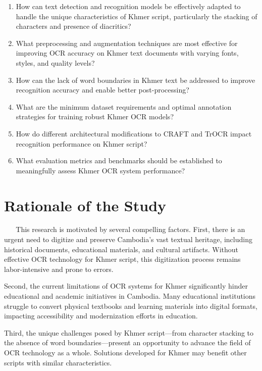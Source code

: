 \begin{enumerate}
    \item How can text detection and recognition models be effectively adapted to handle the unique characteristics of Khmer script, particularly the stacking of characters and presence of diacritics?
    
    \item What preprocessing and augmentation techniques are most effective for improving OCR accuracy on Khmer text documents with varying fonts, styles, and quality levels?
    
    \item How can the lack of word boundaries in Khmer text be addressed to improve recognition accuracy and enable better post-processing?
    
    \item What are the minimum dataset requirements and optimal annotation strategies for training robust Khmer OCR models?
    
    \item How do different architectural modifications to CRAFT and TrOCR impact recognition performance on Khmer script?
    
    \item What evaluation metrics and benchmarks should be established to meaningfully assess Khmer OCR system performance?
\end{enumerate}

\section{Rationale of the Study}
\label{sec:rationale}
​​​​​  ​ ​ ​  ​ This research is motivated by several compelling factors. First, there is an urgent need to digitize and preserve Cambodia's vast textual heritage, including historical documents, educational materials, and cultural artifacts. Without effective OCR technology for Khmer script, this digitization process remains labor-intensive and prone to errors.

Second, the current limitations of OCR systems for Khmer significantly hinder educational and academic initiatives in Cambodia. Many educational institutions struggle to convert physical textbooks and learning materials into digital formats, impacting accessibility and modernization efforts in education.

Third, the unique challenges posed by Khmer script—from character stacking to the absence of word boundaries—present an opportunity to advance the field of OCR technology as a whole. Solutions developed for Khmer may benefit other scripts with similar characteristics.

